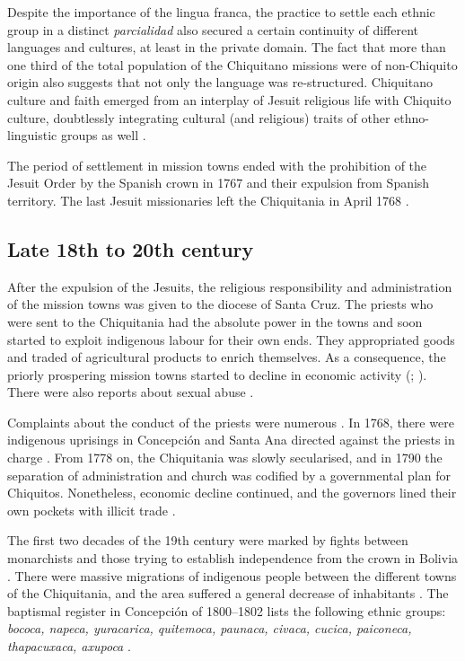 Despite the importance of the lingua franca, the practice to settle each ethnic group in a distinct \textit{parcialidad} also secured a certain continuity of different languages and cultures, at least in the private domain. The fact that more than one third of the total population of the Chiquitano missions were of non-Chiquito origin also suggests that not only the language was re-structured. Chi\-qui\-ta\-no culture and faith emerged from an interplay of Jesuit religious life with Chiquito culture, doubtlessly integrating cultural (and religious) traits of other ethno-linguistic groups as well \citep[278]{TomichaCharupa2002}.

The period of settlement in mission towns ended with the prohibition of the Jesuit Order by the Spanish crown in 1767 and their expulsion from Spanish territory. The last Jesuit missionaries left the Chiquitania in April 1768 \citep[55]{APCOB_Saberes}.


\subsection{Late 18th to 20th century}\label{sec:Century18-20}

After the expulsion of the Jesuits, the religious responsibility and administration of the mission towns was given to the diocese of Santa Cruz. The priests who were sent to the Chiquitania had the absolute power in the towns and soon started to exploit indigenous labour for their own ends. They appropriated goods and traded of agricultural products to enrich themselves. As a consequence, the priorly prospering mission towns started to decline in economic activity (\citealt[56]{APCOB_Saberes}; \citealt[93, 96, 109]{Tonelli2004}). There were also reports about sexual abuse \citep[105]{Tonelli2004}.

Complaints about the conduct of the priests were numerous \citep[cf.][ch. IV]{Tonelli2004}. In 1768, there were indigenous uprisings in Concepción and Santa Ana directed against the priests in charge \citep[102--103]{Tonelli2004}.
From 1778 on, the Chiquitania was slowly secularised, and in 1790 the separation of administration and church was codified by a governmental plan for Chiquitos. Nonetheless, economic decline continued, and the governors lined their own pockets with illicit trade \citep[106--116]{Tonelli2004}. 


\begin{sloppypar}
The first two decades of the 19th century were marked by fights between monarchists and those trying to establish independence from the crown in Bolivia \citep[cf.][ch. V]{Tonelli2004}. There were massive migrations of indigenous people between the different towns of the Chiquitania, and the area suffered a general decrease of inhabitants \citep[144, 169]{Tonelli2004}. The baptismal register in Concepción of 1800–1802 lists the following ethnic groups: \textit{bococa, napeca, yuracarica, quitemoca, paunaca, civaca, cucica, paiconeca, thapacuxaca, axupoca} \citep[9--10]{Villalta2012}.
\end{sloppypar}

